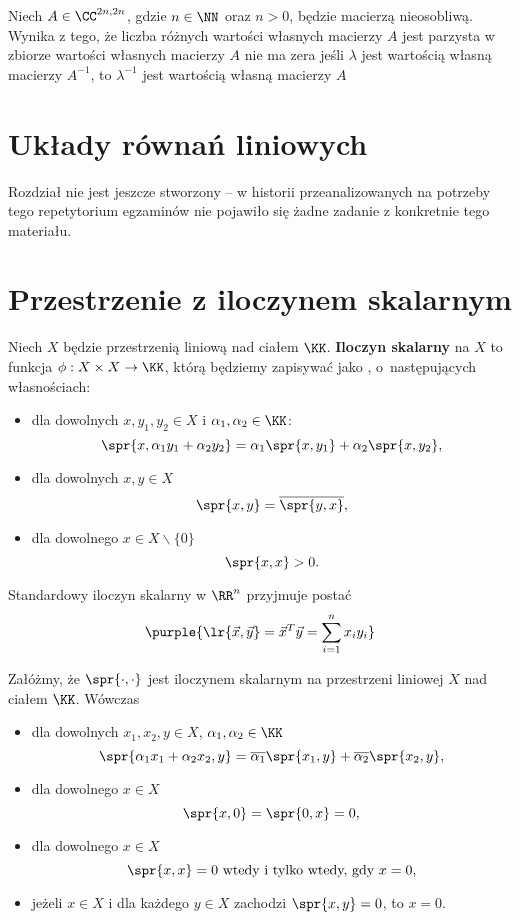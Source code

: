\begin{problems}
    \prob Niech $A \in \CC^{2n, 2n}$, gdzie $n \in \NN$ oraz $n > 0$, będzie macierzą nieosobliwą. Wynika z tego, że
    \answers
    {liczba różnych wartości własnych macierzy $A$ jest parzysta}
    {w zbiorze wartości własnych macierzy $A$ nie ma zera}
    {jeśli $\lambda$ jest wartością własną macierzy $A^{-1}$, to $\lambda^{-1}$ jest wartością własną macierzy $A$}
\end{problems}

\section{Układy równań liniowych}

\begin{editorsnote}
    Rozdział nie jest jeszcze stworzony -- w historii przeanalizowanych na potrzeby tego repetytorium egzaminów nie pojawiło się żadne zadanie z konkretnie tego materiału.
\end{editorsnote}

\section{Przestrzenie z iloczynem skalarnym}

Niech $X$ będzie przestrzenią liniową nad ciałem $\KK$. \textbf{Iloczyn skalarny} na $X$ to funkcja $\phi: X\times X\to\KK$, którą będziemy zapisywać jako , o~następujących własnościach:
\begin{itemize}
    \item dla dowolnych $x,y_1,y_2\in X$ i $\alpha_1,\alpha_2\in\KK$:
    $$
    \spr{x,\alpha_1y_1 + \alpha_2y_2} = \alpha_1\spr{x,y_1} + \alpha_2\spr{x,y_2},
    $$
    \item dla dowolnych $x,y\in X$
    $$
    \spr{x,y} = \overline{\spr{y,x}},
    $$
    \item dla dowolnego $x\in X\backslash\{0\}$
    $$
    \spr{x,x} > 0.
    $$
\end{itemize}

Standardowy iloczyn skalarny w $\RR^n$ przyjmuje postać
$$\purple{\lr{\vec{x}, \vec{y}} = \vec{x}^T\vec{y} = \sum_{i = 1}^{n} x_iy_i}$$

Załóżmy, że $\spr{\cdot,\cdot}$ jest iloczynem skalarnym na przestrzeni liniowej $X$ nad ciałem $\KK$. Wówczas
\begin{itemize}
    \item dla dowolnych $x_1,x_2,y\in X$, $\alpha_1,\alpha_2\in\KK$
    $$
    \spr{\alpha_1x_1+\alpha_2x_2,y} = \overline{\alpha_1}\spr{x_1,y} + \overline{\alpha_2}\spr{x_2,y},
    $$
    \item dla dowolnego $x\in X$
    $$
    \spr{x,0} = \spr{0, x} = 0,
    $$
    \item dla dowolnego $x\in X$
    $$
    \spr{x,x} = 0 \text{ wtedy i tylko wtedy, gdy } x = 0,
    $$
    \item jeżeli $x\in X$ i dla każdego $y\in X$ zachodzi $\spr{x,y}=0$, to $x=0$.
\end{itemize}

